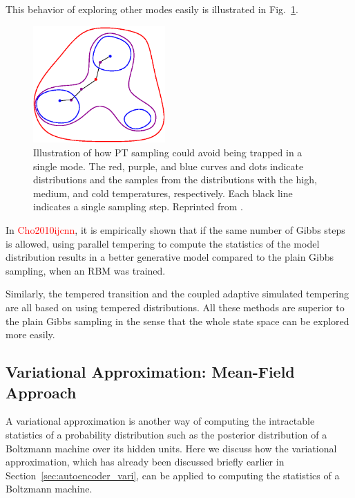 \documentclass{now}
\newcommand{\alert}[1]{\textcolor{red}{#1}}
\newcommand{\citepub}[1]{\alert{#1}}
\begin{document}
This behavior of exploring other modes easily is illustrated
in Fig.~\ref{fig:pt_escape}.

\begin{figure}[t]
    \centering
    \includegraphics[width=0.45\textwidth]{../figures/pt.eps}
    \caption{Illustration of how PT sampling could avoid
    being trapped in a single mode. The red, purple, and
    blue curves and dots indicate distributions and the
    samples from the distributions with the high, medium,
    and cold temperatures, respectively. Each black line
    indicates a single sampling step. Reprinted from
    \citep{Cho2011t}.}
    \label{fig:pt_escape}
\end{figure}

In \citepub{Cho2010ijcnn}, it is empirically shown that if
the same number of Gibbs steps is allowed, using parallel
tempering to compute the statistics of the model
distribution results in a better generative model compared
to the plain Gibbs sampling, when an RBM was trained.

Similarly, the tempered transition and the
coupled adaptive simulated tempering
\citep{Salakhutdinov2010} are all based on using 
tempered distributions. All these methods are superior to
the plain Gibbs sampling in the sense that the whole state
space can be explored more easily.


\subsection{Variational Approximation: Mean-Field Approach}
\label{sec:bm_vari}

A variational approximation is another way of computing the
intractable statistics of a probability distribution such as
the posterior distribution of a Boltzmann machine over its
hidden units. Here we discuss how the variational
approximation, which has already been discussed briefly
earlier in Section~\ref{sec:autoencoder_vari}, can be
applied to computing the statistics of a Boltzmann machine.
\end{document}
